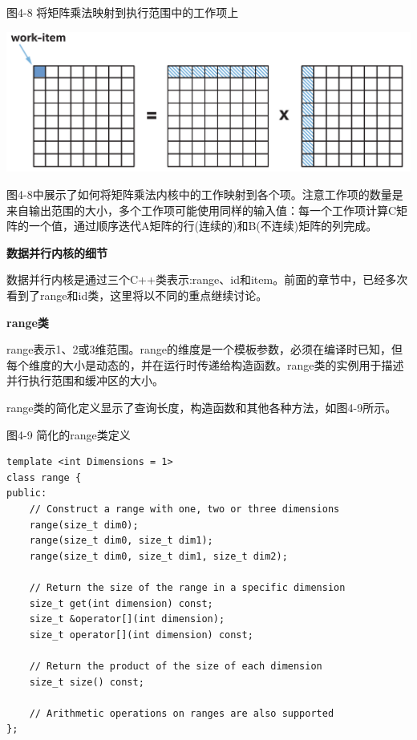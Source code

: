 \hspace*{\fill} \par %
图4-8 将矩阵乘法映射到执行范围中的工作项上
\begin{center}
	\includegraphics[width=1.\textwidth]{content/chapter-4/images/4}
\end{center}

图4-8中展示了如何将矩阵乘法内核中的工作映射到各个项。注意工作项的数量是来自输出范围的大小，多个工作项可能使用同样的输入值：每一个工作项计算C矩阵的一个值，通过顺序迭代A矩阵的行(连续的)和B(不连续)矩阵的列完成。\par

\hspace*{\fill} \par %
\textbf{数据并行内核的细节}

数据并行内核是通过三个C++类表示:range、id和item。前面的章节中，已经多次看到了range和id类，这里将以不同的重点继续讨论。\par

\hspace*{\fill} \par %
\textbf{range类}

range表示1、2或3维范围。range的维度是一个模板参数，必须在编译时已知，但每个维度的大小是动态的，并在运行时传递给构造函数。range类的实例用于描述并行执行范围和缓冲区的大小。\par

range类的简化定义显示了查询长度，构造函数和其他各种方法，如图4-9所示。\par

\hspace*{\fill} \par %
图4-9 简化的range类定义
\begin{lstlisting}[caption={}]
template <int Dimensions = 1>
class range {
public:
	// Construct a range with one, two or three dimensions
	range(size_t dim0);
	range(size_t dim0, size_t dim1);
	range(size_t dim0, size_t dim1, size_t dim2);
	
	// Return the size of the range in a specific dimension 
	size_t get(int dimension) const;
	size_t &operator[](int dimension);
	size_t operator[](int dimension) const;
	
	// Return the product of the size of each dimension
	size_t size() const;
	
	// Arithmetic operations on ranges are also supported
};
\end{lstlisting}


